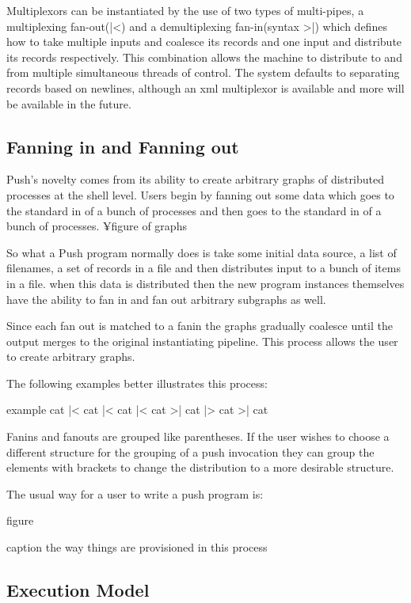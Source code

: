 \documentclass[11pt, letterpaper]{article}
\begin{document}
{     Multiplexors can be instantiated by the use of two types of multi-pipes, a multiplexing fan-out(|<)  and a demultiplexing fan-in(syntax >|) which defines how to take multiple inputs and coalesce its records and one input and distribute its records respectively. This combination allows the machine to distribute to and from multiple simultaneous threads of control. The system defaults to separating records based on newlines, although an xml multiplexor is available and more will be available in the future.    
   

  

\subsection{Fanning in and Fanning out}

Push's novelty comes from its ability to create arbitrary graphs of distributed processes at the shell level. Users begin by fanning out some data which goes to the standard in of a bunch of processes and then goes to the standard in of a bunch of processes. ¥figure of graphs

So what a Push program normally does is take some initial data source, a list of filenames, a set of records in a file and then distributes input to a bunch of items in a file. when this data is distributed then the new program instances themselves have the ability to fan in and fan out arbitrary subgraphs as well. 

Since each fan out is matched to a fanin the graphs gradually coalesce until the output merges to the original instantiating pipeline. This process allows the user to create arbitrary graphs. 

The following examples better illustrates this process:

example{
cat |< cat |< cat |< cat >| cat |> cat >| cat }
}

Fanins and fanouts are grouped like parentheses. If the user wishes to choose a different structure for the grouping of a push invocation they can group the elements with brackets to change the distribution to a more desirable structure. 

The usual way for a user to write a push program is:


  

figure{

}caption{
the way things are provisioned in this process
}


\subsection{Execution Model}
\end{document}
